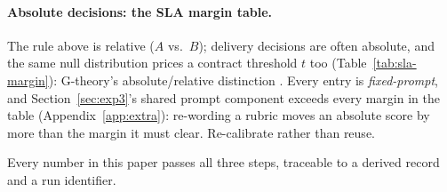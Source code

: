 \paragraph{Absolute decisions: the SLA margin table.}
The rule above is relative ($A$ vs.\ $B$); delivery decisions are often
absolute, and the same null distribution prices a contract threshold $t$ too
(Table~\ref{tab:sla-margin}): G-theory's absolute/relative distinction
\citep{cronbach1972dependability, messing2026tee}.
Every entry is \emph{fixed-prompt}, and Section~\ref{sec:exp3}'s shared prompt
component exceeds every margin in the table
(Appendix~\ref{app:extra}): re-wording a rubric moves an absolute score by more
than the margin it must clear. Re-calibrate rather than reuse.



Every number in this paper passes all three steps, traceable to a derived
record and a run identifier.
